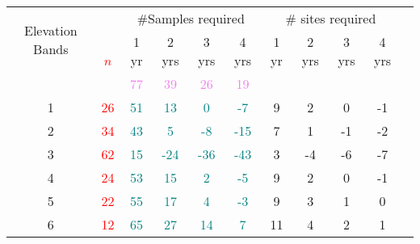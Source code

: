 \begin{table}\scriptsize
\centering
\begin{tabular}{cccccc|ccccc}
\toprule
\multirow{2}{1cm}{Elevation Bands}  & & \multicolumn{4}{c}{ \#Samples required} & \multicolumn{4}{c}{\# sites required} \\ \cline{3-10}\noalign{\smallskip}
 \multicolumn{1}{c}{}&\multirow{2}{.3cm}{\textcolor{red}{$n$}}& 1 yr   & 2 yrs  & 3 yrs     & 4 yrs   & 1 yr  & 2 yrs & 3 yrs  & 4 yrs \\ 
						&		           &\textcolor{violet}{77} &\textcolor{violet}{39} &\textcolor{violet}{26} &\textcolor{violet}{19}&&&&&\\ \midrule
1                                                                   &\textcolor{red}{26}&    \textcolor{teal}{51}   &  \textcolor{teal}{13}       &  \textcolor{teal}{0}        & \textcolor{teal}{-7}                         & 9 & 2 & 0  & -1 \\ 
2                                                                      &\textcolor{red}{34}&  \textcolor{teal}{43} &  \textcolor{teal}{5} &  \textcolor{teal}{-8}     &  \textcolor{teal}{-15}                                    & 7 & 1  & -1   & -2 \\ 
3                                                                      &\textcolor{red}{62}&  \textcolor{teal}{15} &  \textcolor{teal}{-24}  &  \textcolor{teal}{-36} &  \textcolor{teal}{-43}                                  & 3   & -4 & -6 & -7 \\
4                                                                      &\textcolor{red}{24}&   \textcolor{teal}{53} &  \textcolor{teal}{15} &  \textcolor{teal}{2}  &  \textcolor{teal}{-5}                                      & 9& 2 & 0  & -1 \\ 
5                                                                      &\textcolor{red}{22}&   \textcolor{teal}{55} &  \textcolor{teal}{17} &  \textcolor{teal}{4}  &  \textcolor{teal}{-3}                                      & 9& 3  & 1  & 0\\ 
6                                                                     &\textcolor{red}{12}&   \textcolor{teal}{65} &  \textcolor{teal}{27} &  \textcolor{teal}{14}  &  \textcolor{teal}{7}                                     & 11 & 4 &2 & 1 \\ \bottomrule
\end{tabular}
\label{tab:TVapsenario}
\end{table}